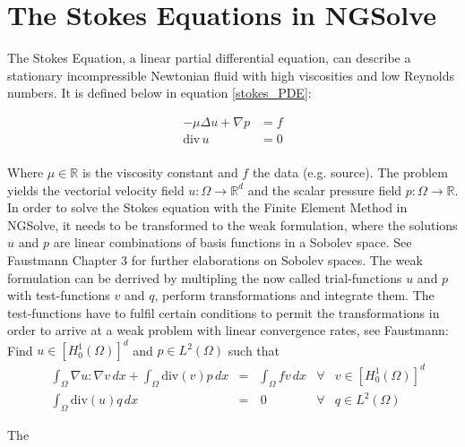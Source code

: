 \section{The Stokes Equations in NGSolve}

The Stokes Equation, a linear partial differential equation, can describe a stationary incompressible Newtonian fluid
with high viscosities and low Reynolds numbers. It is defined below in equation \ref{stokes_PDE}:
\null

\begin{equation}\label{stokes_PDE}
    \begin{aligned}
    -\mu \Delta u + \nabla p &= f \\
    \mathrm{div} \, u &= 0 \\
    \end{aligned}
\end{equation}

\null

Where $\mu \in \mathbb{R}$ is the viscosity constant and $f$ the data (e.g. source). 
The problem yields the vectorial velocity field $u:\Omega \rightarrow \mathbb{R}^d$ and 
the scalar pressure field $p:\Omega \rightarrow \mathbb{R}$. In order to solve the Stokes equation with the Finite Element Method in NGSolve,
it needs to be transformed to the weak formulation, where the solutions $u$ and $p$ are linear combinations of basis functions in a Sobolev space.
See Faustmann\cite{lecture_notes_faustmann_numPDE} Chapter 3 for further elaborations on Sobolev spaces. The weak formulation can be derrived by
multipling the now called trial-functions $u$ and $p$ with test-functions $v$ and $q$, perform transformations and integrate them. The test-functions have to fulfil certain
conditions to permit the transformations in order to arrive at a weak problem with 
linear convergence rates, see Faustmann\cite{lecture_notes_faustmann_numPDE}: \\

Find $u \in [H^1_0(\Omega)]^d$ and $p \in L^2(\Omega)$ such that
\begin{equation}\label{weak_stokes_PDE}
    \begin{aligned}
    &\int_{\Omega} \nabla u : \nabla v \, dx + \int_{\Omega} \mathrm{div}(v)p \, dx &=& \int_{\Omega}f v \, dx &\forall& v \in [H^1_0(\Omega)]^d \\
    &\int_{\Omega} \mathrm{div}(u)q \, dx &=& \, 0   &\forall& q \in L^2(\Omega)
    \end{aligned}
\end{equation}

The

